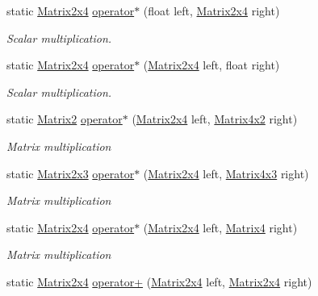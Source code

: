 \begin{DoxyCompactItemize}
static \hyperlink{struct_open_t_k_1_1_matrix2x4}{Matrix2x4} \hyperlink{struct_open_t_k_1_1_matrix2x4_af317408bc7442e0866e12d3552ba073d}{operator$\ast$} (float left, \hyperlink{struct_open_t_k_1_1_matrix2x4}{Matrix2x4} right)
\begin{DoxyCompactList}\small\item\em Scalar multiplication. \end{DoxyCompactList}\item 
static \hyperlink{struct_open_t_k_1_1_matrix2x4}{Matrix2x4} \hyperlink{struct_open_t_k_1_1_matrix2x4_abb5992bdf32545d1d5b88b5fca07eacd}{operator$\ast$} (\hyperlink{struct_open_t_k_1_1_matrix2x4}{Matrix2x4} left, float right)
\begin{DoxyCompactList}\small\item\em Scalar multiplication. \end{DoxyCompactList}\item 
static \hyperlink{struct_open_t_k_1_1_matrix2}{Matrix2} \hyperlink{struct_open_t_k_1_1_matrix2x4_aa85a9349c8385ee9900d1509f72ef5df}{operator$\ast$} (\hyperlink{struct_open_t_k_1_1_matrix2x4}{Matrix2x4} left, \hyperlink{struct_open_t_k_1_1_matrix4x2}{Matrix4x2} right)
\begin{DoxyCompactList}\small\item\em Matrix multiplication \end{DoxyCompactList}\item 
static \hyperlink{struct_open_t_k_1_1_matrix2x3}{Matrix2x3} \hyperlink{struct_open_t_k_1_1_matrix2x4_a4205f49326f822bcc2a1355a81049b16}{operator$\ast$} (\hyperlink{struct_open_t_k_1_1_matrix2x4}{Matrix2x4} left, \hyperlink{struct_open_t_k_1_1_matrix4x3}{Matrix4x3} right)
\begin{DoxyCompactList}\small\item\em Matrix multiplication \end{DoxyCompactList}\item 
static \hyperlink{struct_open_t_k_1_1_matrix2x4}{Matrix2x4} \hyperlink{struct_open_t_k_1_1_matrix2x4_afc260017f41a1a94d6084aee3a696ed6}{operator$\ast$} (\hyperlink{struct_open_t_k_1_1_matrix2x4}{Matrix2x4} left, \hyperlink{struct_open_t_k_1_1_matrix4}{Matrix4} right)
\begin{DoxyCompactList}\small\item\em Matrix multiplication \end{DoxyCompactList}\item 
static \hyperlink{struct_open_t_k_1_1_matrix2x4}{Matrix2x4} \hyperlink{struct_open_t_k_1_1_matrix2x4_a7022289f0007c962ca634275b06abf1e}{operator+} (\hyperlink{struct_open_t_k_1_1_matrix2x4}{Matrix2x4} left, \hyperlink{struct_open_t_k_1_1_matrix2x4}{Matrix2x4} right)

\end{DoxyCompactItemize}
